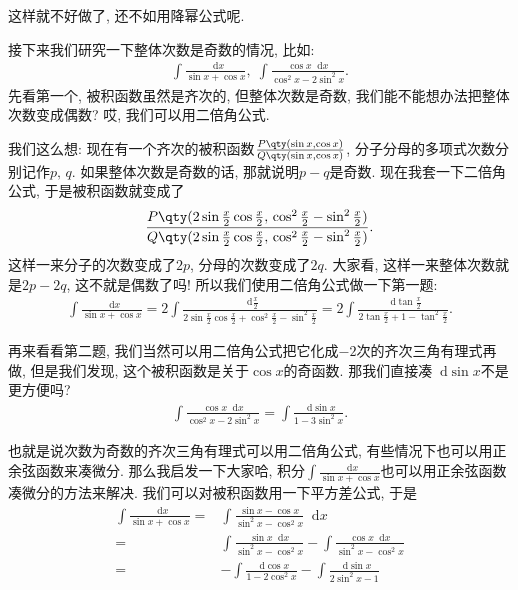 \documentclass{ctexbook}
\newcommand*{\dif}{\mathop{}\!\mathrm{d}}
\begin{document}
{这样就不好做了, 还不如用降幂公式呢. \par
接下来我们研究一下整体次数是奇数的情况, 比如: 
\begin{align*}
\int\frac{\dif{x}}{\sin{x}+\cos{x}},\;\int\frac{\cos{x}\dif{x}}{\cos^{2}{x}-2\sin^{2}{x}}
.\end{align*}
先看第一个, 被积函数虽然是齐次的, 但整体次数是奇数, 我们能不能想办法把整体次数变成偶数? 哎, 我们可以用二倍角公式. \par
我们这么想: 现在有一个齐次的被积函数$\frac{P\qty(\sin{x},\cos{x})}{Q\qty(\sin{x},\cos{x})}$, 分子分母的多项式次数分别记作$p,\,q$. 如果整体次数是奇数的话, 那就说明$p-q$是奇数. 现在我套一下二倍角公式, 于是被积函数就变成了
\begin{align*}
\frac{P\qty(2\sin{\frac{x}{2}}\cos{\frac{x}{2}},\,\cos^{2}{\frac{x}{2}}-\sin^{2}{\frac{x}{2}})}{Q\qty(2\sin{\frac{x}{2}}\cos{\frac{x}{2}},\,\cos^{2}{\frac{x}{2}}-\sin^{2}{\frac{x}{2}})}
.\end{align*}
这样一来分子的次数变成了$2p$, 分母的次数变成了$2q$. 大家看, 这样一来整体次数就是$2p-2q$, 这不就是偶数了吗! 
所以我们使用二倍角公式做一下第一题: 
\begin{align*}
\int\frac{\dif{x}}{\sin{x}+\cos{x}}=2\int\frac{\dif{\frac{x}{2}}}{2\sin{\frac{x}{2}}\cos{\frac{x}{2}}+\cos^{2}{\frac{x}{2}}-\sin^{2}{\frac{x}{2}}}=2\int\frac{\dif{\tan{\frac{x}{2}}}}{2\tan{\frac{x}{2}}+1-\tan^{2}{\frac{x}{2}}}
.\end{align*}\par
再来看看第二题, 我们当然可以用二倍角公式把它化成$-2$次的齐次三角有理式再做, 但是我们发现, 这个被积函数是关于$\cos{x}$的奇函数. 那我们直接凑$\dif{\sin{x}}$不是更方便吗? 
\begin{align*}
\int\frac{\cos{x}\dif{x}}{\cos^{2}{x}-2\sin^{2}{x}}=\int\frac{\dif{\sin{x}}}{1-3\sin^{2}{x}}
.\end{align*}\par
也就是说次数为奇数的齐次三角有理式可以用二倍角公式, 有些情况下也可以用正余弦函数来凑微分. 那么我启发一下大家哈, 积分$\int\frac{\dif{x}}{\sin{x}+\cos{x}}$也可以用正余弦函数凑微分的方法来解决. 我们可以对被积函数用一下平方差公式, 于是
\begin{align*}
\int\frac{\dif{x}}{\sin{x}+\cos{x}}={}&\int\frac{\sin{x}-\cos{x}}{\sin^{2}{x}-\cos^{2}{x}}\dif{x}\\
={}&\int\frac{\sin{x}\dif{x}}{\sin^{2}{x}-\cos^{2}{x}}-\int\frac{\cos{x}\dif{x}}{\sin^{2}{x}-\cos^{2}{x}}\\
={}&-\int\frac{\dif{\cos{x}}}{1-2\cos^{2}{x}}-\int\frac{\dif{\sin{x}}}{2\sin^{2}{x}-1}

\end{align*}}
\end{document}
